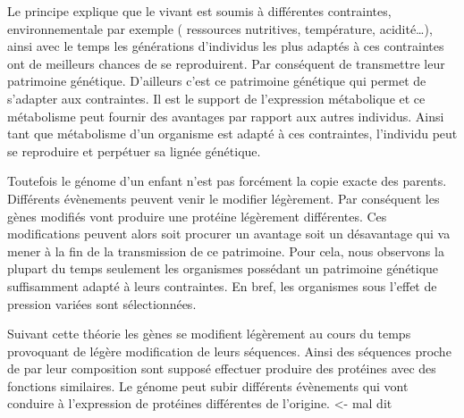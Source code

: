 \begin{refsegment}
    Le principe explique que le vivant est soumis à différentes contraintes, environnementale par exemple ( ressources nutritives, température, acidité\ldots ), ainsi avec le temps les générations d’individus les plus adaptés à ces contraintes ont de meilleurs chances de se reproduirent. Par conséquent de transmettre leur patrimoine génétique. D’ailleurs c’est ce patrimoine génétique qui permet de s’adapter aux contraintes. Il est le support de l’expression métabolique et ce métabolisme peut fournir des avantages par rapport aux autres individus. Ainsi tant que métabolisme d’un organisme est adapté à ces contraintes, l’individu peut se reproduire et perpétuer sa lignée génétique.
    
    Toutefois le génome d’un enfant n’est pas forcément la copie exacte des parents. Différents évènements peuvent venir le modifier légèrement. Par conséquent les gènes modifiés vont produire une protéine légèrement différentes. Ces modifications peuvent alors soit procurer un avantage soit un désavantage qui va mener à la fin de la transmission de ce patrimoine. Pour cela, nous observons la plupart du temps seulement les organismes possédant un patrimoine génétique suffisamment adapté à leurs contraintes. En bref, les organismes sous l’effet de pression variées sont sélectionnées.
    
    Suivant cette théorie les gènes se modifient légèrement au cours du temps provoquant de légère modification de leurs séquences. Ainsi des séquences proche de par leur composition sont supposé effectuer produire des protéines avec des fonctions similaires. Le génome peut subir différents évènements qui vont conduire à l’expression de protéines différentes de l’origine. <- mal dit
    

\end{refsegment}
